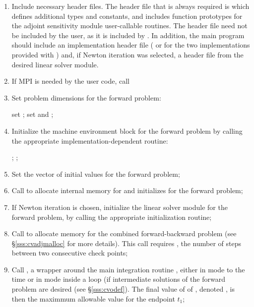 \begin{enumerate}

\item
  Include necessary header files. The header file that is always required
  is  which defines additional types and constants, and includes
  function prototypes for the adjoint sensitivity module user-callable routines.
  The header file  need not be included by the user, as it is included 
  by . In addition, the main program should include an {\nvector} 
  implementation header file ( or 
  for the two implementations provided with {\cvodes}) and, if Newton iteration 
  was selected, a header file from the desired linear solver module.

\item
  {\p} If MPI is needed by the user code, call 

\item
  Set problem dimensions for the forward problem:

  {\s} set ; {\p} set  and ;

\item
  Initialize the machine environment block for the forward problem by calling 
  the appropriate implementation-dependent {\nvector} routine:

  {\s} ; {\p} ;

\item
  Set the vector  of initial values for the forward problem; 

\item
  Call \id{()} to allocate internal memory for 
  {\cvodes} and initializes {\cvodes} for the forward problem;

\item
  If Newton iteration is chosen, initialize the linear solver module 
  for the forward problem, by calling the appropriate initialization routine;

\item
  Call \id{()} to allocate memory for the 
  combined forward-backward problem (see \S\ref{sss:cvadjmalloc} for more details). 
  This call requires , the number of steps between two consecutive check points;

\item
  Call , a wrapper around the {\cvodes} main integration
  routine , either in  mode to the time 
   or in  mode inside a loop (if intermediate
  solutions of the forward problem are desired (see \S\ref{sss:cvodef}).
  The final value of of , denoted , is then
  the maximmum allowable value for the endpoint $t_1$;


\end{enumerate}
